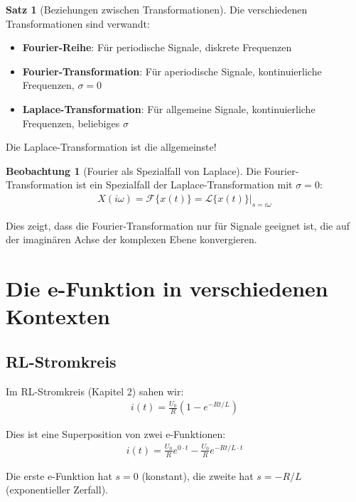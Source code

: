 ﻿\documentclass[a4paper,12pt]{report}
\theoremstyle{definition}
\newtheorem{satz}{Satz}
\newtheorem{beobachtung}{Beobachtung}
\begin{document}
	\begin{satz}[Beziehungen zwischen Transformationen]
		Die verschiedenen Transformationen sind verwandt:
		\begin{itemize}
			\item[-] \textbf{Fourier-Reihe}: Für periodische Signale, diskrete Frequenzen
			\item[-] \textbf{Fourier-Transformation}: Für aperiodische Signale, kontinuierliche Frequenzen, $\sigma = 0$
			\item[-] \textbf{Laplace-Transformation}: Für allgemeine Signale, kontinuierliche Frequenzen, beliebiges $\sigma$
		\end{itemize}
		
		Die Laplace-Transformation ist die allgemeinste!
	\end{satz}
	
	\begin{beobachtung}[Fourier als Spezialfall von Laplace]
		Die Fourier-Transformation ist ein Spezialfall der Laplace-Transformation mit $\sigma = 0$:
		\begin{align}
			X(i\omega) = \mathcal{F}\{x(t)\} = \mathcal{L}\{x(t)\}|_{s=i\omega}
		\end{align}
		
		Dies zeigt, dass die Fourier-Transformation nur für Signale geeignet ist, die auf der imaginären Achse der komplexen Ebene konvergieren.
	\end{beobachtung}
	
	\section{Die e-Funktion in verschiedenen Kontexten}
	
	\subsection{RL-Stromkreis}
	
	Im RL-Stromkreis (Kapitel 2) sahen wir:
	\begin{align}
		i(t) = \frac{U_0}{R} (1 - e^{-Rt/L})
	\end{align}
	
	Dies ist eine Superposition von zwei e-Funktionen:
	\begin{align}
		i(t) = \frac{U_0}{R} e^{0 \cdot t} - \frac{U_0}{R} e^{-Rt/L \cdot t}
	\end{align}
	
	Die erste e-Funktion hat $s = 0$ (konstant), die zweite hat $s = -R/L$ (exponentieller Zerfall).
	
\end{document}
